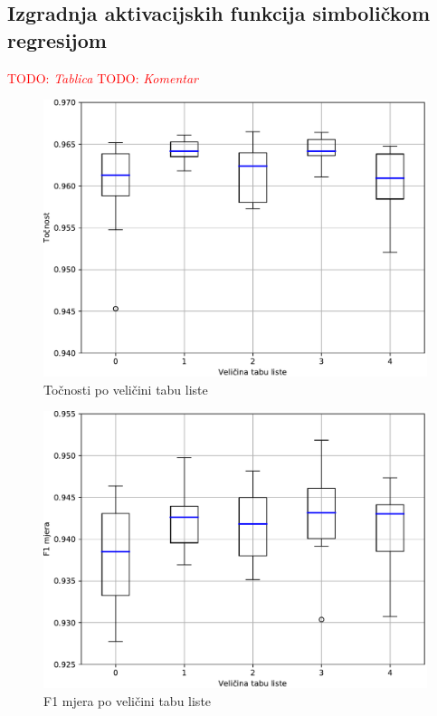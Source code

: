 \documentclass[times, utf8, numeric, diplomski]{fer}
\def\TODO#1{\noindent\textcolor{red}{TODO: \textit{#1}}\newline}
\def\todo#1{\TODO{#1}}
\begin{document}
\clearpage

\subsection{Izgradnja aktivacijskih funkcija simboličkom regresijom}
\todo{Tablica}
\todo{Komentar}

\begin{figure}[H]
\includegraphics[width=\textwidth]{GP_9class_acc.pdf}
\centering
\caption{Točnosti po veličini tabu liste}
\label{fig:gp_9_acc}
\end{figure}

\begin{figure}[H]
\includegraphics[width=\textwidth]{GP_9class_f1.pdf}
\centering
\caption{F1 mjera po veličini tabu liste}
\label{fig:gp_9_f1}
\end{figure}
\end{document}
